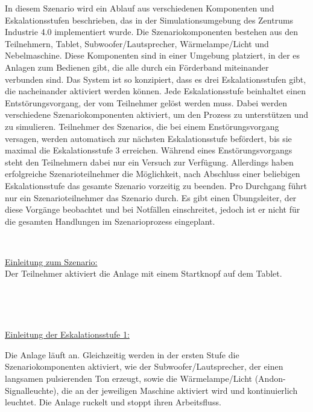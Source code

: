 In diesem Szenario wird ein Ablauf aus verschiedenen Komponenten und Eskalationsstufen beschrieben, das in der Simulationsumgebung des Zentrums Industrie 4.0 implementiert wurde. Die Szenariokomponenten bestehen aus den Teilnehmern, Tablet, Subwoofer/Lautsprecher, Wärmelampe/Licht und Nebelmaschine. Diese Komponenten sind in einer Umgebung platziert, in der es Anlagen zum Bedienen gibt, die alle durch ein Förderband miteinander verbunden sind. Das System ist so konzipiert, dass es drei Eskalationsstufen gibt, die nacheinander aktiviert werden können. Jede Eskalationsstufe beinhaltet einen Entstörungsvorgang, der vom Teilnehmer gelöst werden muss. Dabei werden verschiedene Szenariokomponenten aktiviert, um den Prozess zu unterstützen und zu simulieren. Teilnehmer des Szenarios, die bei einem Enstörungsvorgang versagen, werden automatisch zur nächsten Eskalationsstufe befördert, bis sie maximal die Eskalationsstufe 3 erreichen. Während eines Enstörungsvorgangs steht den Teilnehmern dabei nur ein Versuch zur Verfügung. Allerdings haben erfolgreiche Szenarioteilnehmer die Möglichkeit, nach Abschluss einer beliebigen Eskalationsstufe das gesamte Szenario vorzeitig zu beenden. Pro Durchgang führt nur ein Szenarioteilnehmer das Szenario durch. Es gibt einen Übungsleiter, der diese Vorgänge beobachtet und bei Notfällen einschreitet, jedoch ist er nicht für die gesamten Handlungen im Szenarioprozess eingeplant.

\

\underline{Einleitung zum Szenario:} \\
Der Teilnehmer aktiviert die Anlage mit einem Startknopf auf dem Tablet.\hspace{0pt}

\

\

\underline{Einleitung der Eskalationsstufe 1:}

Die Anlage läuft an. \hspace{0pt}
Gleichzeitig werden in der ersten Stufe die Szenariokomponenten aktiviert, wie der Subwoofer/Lautsprecher, der einen langsamen pulsierenden Ton erzeugt,\hspace{0pt} sowie die Wärmelampe/Licht (Andon-Signalleuchte), die an der jeweiligen Maschine aktiviert wird und kontinuierlich leuchtet.
Die Anlage ruckelt und stoppt ihren Arbeitsfluss. \hspace{0pt}

